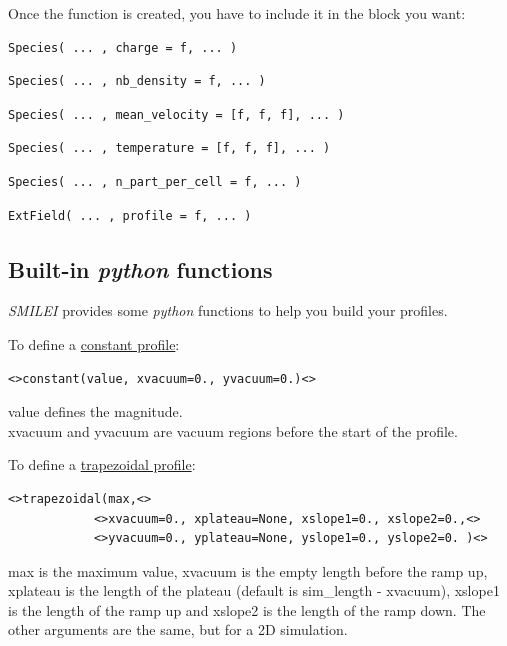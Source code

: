 \documentclass[11pt]{article}
\newcommand{\code}[1]{\colorbox{yellow!15}{\ttfamily #1}}
\newcommand{\python}{\emph{python}\xspace}
\newcommand{\smilei}{\emph{SMILEI}\xspace}
\begin{document}
Once the function is created, you have to include it in the block you want:
\begin{lstlisting}
Species( ... , charge = f, ... )
\end{lstlisting}
\begin{lstlisting}
Species( ... , nb_density = f, ... )
\end{lstlisting}
\begin{lstlisting}
Species( ... , mean_velocity = [f, f, f], ... )
\end{lstlisting}
\begin{lstlisting}
Species( ... , temperature = [f, f, f],	... )
\end{lstlisting}
\begin{lstlisting}
Species( ... , n_part_per_cell = f, ... )
\end{lstlisting}
\begin{lstlisting}
ExtField( ... , profile = f, ... )
\end{lstlisting}

\subsection{Built-in \python functions\label{sec:pyprofiles}}
\smilei provides some \python functions to help you build your profiles.
\vspace{10pt}


\begingroup
\setlength{\parskip}{0pt}
To define a \underline{constant profile}:
\begin{lstlisting}
<>constant(value, xvacuum=0., yvacuum=0.)<>
\end{lstlisting}
\code{value} defines the magnitude.\\
\code{xvacuum} and \code{yvacuum} are vacuum regions before the start of the profile.
\vspace{10pt}

To define a \underline{trapezoidal profile}:
\begin{lstlisting}
<>trapezoidal(max,<>
            <>xvacuum=0., xplateau=None, xslope1=0., xslope2=0.,<>
            <>yvacuum=0., yplateau=None, yslope1=0., yslope2=0. )<>
\end{lstlisting}
\code{max} is the maximum value, \code{xvacuum} is the empty length before the ramp up,
\code{xplateau} is the length of the plateau (default is {\ttfamily sim\_length - xvacuum}),
\code{xslope1} is the length of the ramp up and \code{xslope2} is the length of the ramp down.
The other arguments are the same, but for a 2D simulation.\\
\vspace{10pt}
\end{document}
